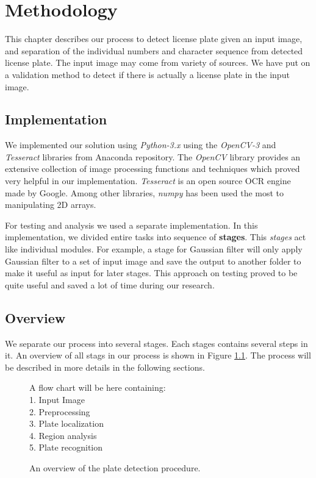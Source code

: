 \documentclass{standalone}
\begin{document}
\chapter{Methodology}
This chapter describes our process to detect license plate given an input image, and separation of the individual numbers and character sequence from detected license plate. The input image may come from variety of sources. We have put on a validation method to detect if there is actually a license plate in the input image.







\section{Implementation}
We implemented our solution using {\it Python-3.x} using the {\it OpenCV-3} and {\it Tesseract} libraries from Anaconda repository. 
The {\it OpenCV} library provides an extensive collection of image processing functions and techniques which proved very helpful in our implementation. 
{\it Tesseract} is an open source OCR engine made by Google.
Among other libraries, {\it numpy} has been used the most to manipulating 2D arrays.

For testing and analysis we used a separate implementation. In this implementation, we divided entire tasks into sequence of {\bf stages}. This {\it stages} act like individual modules. For example, a stage for Gaussian filter will only apply Gaussian filter to a set of input image and save the output to another folder to make it useful as input for later stages. This approach on testing proved to be quite useful and saved a lot of time during our research.






\section{Overview}
We separate our process into several stages. Each stages contains several steps in it. An overview of all stags in our process is shown in Figure \ref{fig:ProcessOverview}. The process will be described in more details in the following sections.

\begin{figure} 
	\centering
    {\small
      A flow chart will be here containing:\\
      1. Input Image\\
      2. Preprocessing\\
      3. Plate localization\\
      4. Region analysis\\
      5. Plate recognition
    }
	\caption{An overview of the plate detection procedure.} 
	\label{fig:ProcessOverview}
\end{figure}
\end{document}
